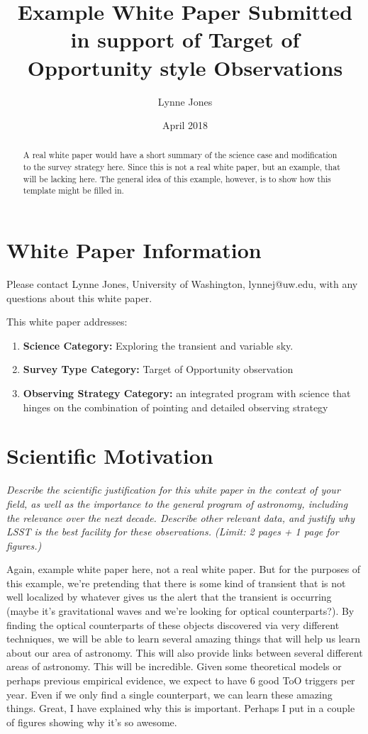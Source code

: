 \documentclass[11pt]{article}
\title{Example White Paper Submitted in support of Target of Opportunity style Observations}
\author{Lynne Jones}
\date{April 2018}
\begin{document}
\maketitle

\begin{abstract}
A real white paper would have a short summary of the science case and modification to the survey strategy
here. Since this is not a real white paper, but an example, that will be lacking here. The general idea of this
example, however, is to show how this template might be filled in. 
\end{abstract}

\section{White Paper Information}
Please contact Lynne Jones, University of Washington, lynnej@uw.edu, with any questions about this white paper. 

This white paper addresses:
\begin{enumerate} 
\item {\bf Science Category:} Exploring the transient and variable sky.
\item {\bf Survey Type Category:} Target of Opportunity observation
\item {\bf Observing Strategy Category:} an integrated program with science that hinges on the combination of pointing and detailed observing strategy
\end{enumerate}  

\clearpage

\section{Scientific Motivation}

\begin{footnotesize}
{\it Describe the scientific justification for this white paper in the context
of your field, as well as the importance to the general program of astronomy, 
including the relevance over the next decade. 
Describe other relevant data, and justify why LSST is the best facility for these observations.
(Limit: 2 pages + 1 page for figures.)}
\end{footnotesize}

Again, example white paper here, not a real white paper. But for the purposes of this
example, we're pretending that there is some kind of transient that is not well localized
by whatever gives us the alert that the transient is occurring (maybe it's gravitational waves 
and we're looking for optical counterparts?).  By finding the optical counterparts of
these objects discovered via very different techniques, we will be able to learn 
several amazing things that will help us learn about our area of astronomy. This will 
also provide links between several different areas of astronomy. This will be incredible. 
Given some theoretical models or perhaps previous empirical evidence, we expect to have 6 good ToO triggers per year. 
Even if we only find a single counterpart, we can learn these amazing things.
Great, I have explained why this is important.  Perhaps I put in a couple of figures showing why it's so awesome.
\end{document}
